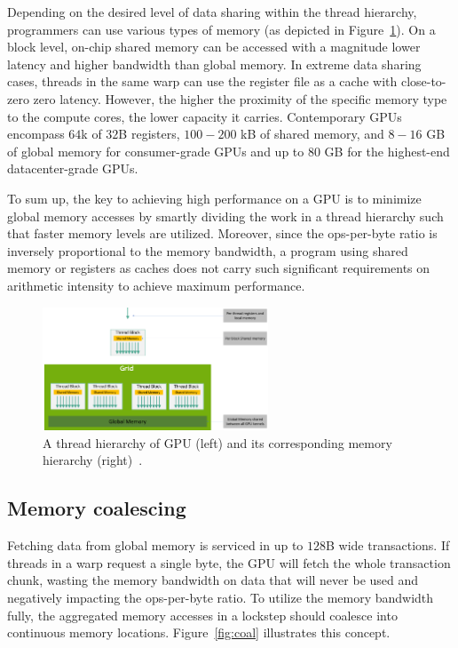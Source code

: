 Depending on the desired level of data sharing within the thread hierarchy, programmers can use various types of memory (as depicted in Figure~\ref{fig:mem-hierarchy}). On a block level, on-chip shared memory can be accessed with a magnitude lower latency and higher bandwidth than global memory. In extreme data sharing cases, threads in the same warp can use the register file as a cache with close-to-zero zero latency. However, the higher the proximity of the specific memory type to the compute cores, the lower capacity it carries. Contemporary GPUs encompass $64$k of $32$B registers, $100-200$ kB of shared memory, and $8-16$ GB of global memory for consumer-grade GPUs and up to $80$ GB for the highest-end datacenter-grade GPUs.

To sum up, the key to achieving high performance on a GPU is to minimize global memory accesses by smartly dividing the work in a thread hierarchy such that faster memory levels are utilized. Moreover, since the ops-per-byte ratio is inversely proportional to the memory bandwidth, a program using shared memory or registers as caches does not carry such significant requirements on arithmetic intensity to achieve maximum performance.

\begin{figure}
    \centering
    \includegraphics[width=0.6\textwidth]{img/mem-hierarchy-2.png}
    \caption{A thread hierarchy of GPU (left) and its corresponding memory hierarchy (right)~\cite{site:cuda}.}
    \label{fig:mem-hierarchy}
\end{figure}

\subsection{Memory coalescing}
\label{sec:coalescing}

Fetching data from global memory is serviced in up to $128$B wide transactions. If threads in a warp request a single byte, the GPU will fetch the whole transaction chunk, wasting the memory bandwidth on data that will never be used and negatively impacting the ops-per-byte ratio. To utilize the memory bandwidth fully, the aggregated memory accesses in a lockstep should coalesce into continuous memory locations. Figure~\ref{fig:coal} illustrates this concept.

